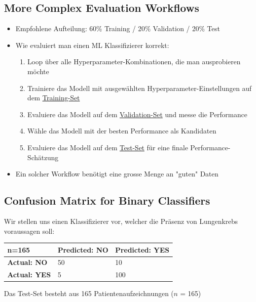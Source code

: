 \documentclass[a4paper]{article}
\begin{document}
		\subsection{More Complex Evaluation Workflows}
		
		\begin{itemize}
			\item Empfohlene Aufteilung: 60\% Training / 20\% Validation / 20\% Test
			\item Wie evaluiert man einen ML Klassifizierer korrekt:
				\begin{enumerate}
					\item Loop über alle Hyperparameter-Kombinationen, die man ausprobieren möchte
					\item Trainiere das Modell mit ausgewählten Hyperparameter-Einstellungen auf dem \underline{Training-Set}
					\item Evaluiere das Modell auf dem \underline{Validation-Set} und messe die Performance
					\item Wähle das Modell mit der besten Performance als Kandidaten
					\item Evaluiere das Modell auf dem \underline{Test-Set} für eine finale Performance-Schätzung
				\end{enumerate}
			\item Ein solcher Workflow benötigt eine grosse Menge an "guten" Daten
		\end{itemize}
	
		\subsection{Confusion Matrix for Binary Classifiers}
		
		Wir stellen uns einen Klassifizierer vor, welcher die Präsenz von Lungenkrebs voraussagen soll:
		
		\begin{table}[htb!]
			\begin{tabular}{l|l|l|}
				\cline{2-3}
				n=165                             & \textbf{Predicted: NO} & \textbf{Predicted: YES} \\ \hline
				\multicolumn{1}{|l|}{\textbf{Actual: NO}}  & 50            & 10             \\ \hline
				\multicolumn{1}{|l|}{\textbf{Actual: YES}} & 5             & 100            \\ \hline
			\end{tabular}
		\end{table}
	\noindent
		Das Test-Set besteht aus 165 Patientenaufzeichnungen ($n$ = 165)
	
\end{document}

